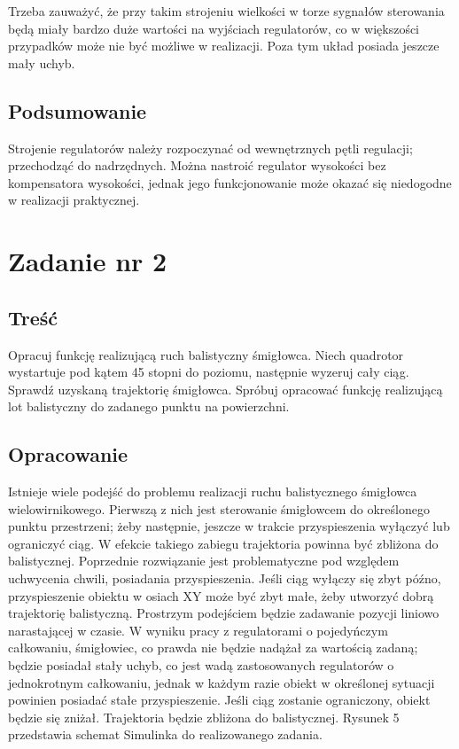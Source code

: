 \documentclass[polish,11pt,a4paper]{article}
\begin{document}
Trzeba zauważyć, że przy takim strojeniu wielkości w torze sygnałów sterowania będą miały bardzo duże wartości
na wyjściach regulatorów, co w większości przypadków może nie być możliwe w realizacji. Poza tym układ posiada jeszcze
mały uchyb. 
\subsection*{Podsumowanie}
Strojenie regulatorów należy rozpoczynać od wewnętrznych pętli regulacji; przechodząć do nadrzędnych. Można nastroić regulator
wysokości bez kompensatora wysokości, jednak jego funkcjonowanie może okazać się niedogodne w realizacji praktycznej.
\section*{Zadanie nr 2}
\subsection*{Treść}
Opracuj funkcję realizującą ruch balistyczny śmigłowca. Niech quadrotor wystartuje
pod kątem 45 stopni do poziomu, następnie wyzeruj cały ciąg. Sprawdź uzyskaną trajektorię śmigłowca.
Spróbuj opracować funkcję realizującą lot balistyczny do zadanego punktu na powierzchni.

\subsection*{Opracowanie}
Istnieje wiele podejść do problemu realizacji ruchu balistycznego śmigłowca wielowirnikowego.
Pierwszą z nich jest sterowanie śmigłowcem do określonego punktu przestrzeni; żeby następnie, jeszcze 
w trakcie przyspieszenia wyłączyć lub ograniczyć ciąg. W efekcie takiego zabiegu trajektoria powinna być
zbliżona do balistycznej. Poprzednie rozwiązanie jest problematyczne pod względem uchwycenia chwili, 
posiadania przyspieszenia. Jeśli ciąg wyłączy się zbyt późno, przyspieszenie obiektu w osiach XY może być
zbyt małe, żeby utworzyć dobrą trajektorię balistyczną. Prostrzym podejściem będzie zadawanie pozycji
liniowo narastającej w czasie. W wyniku pracy z regulatorami o pojedyńczym całkowaniu, śmigłowiec, co prawda
nie będzie nadążał za wartością zadaną; będzie posiadał stały uchyb, co jest wadą zastosowanych regulatorów o 
jednokrotnym całkowaniu, jednak w każdym razie obiekt w określonej sytuacji powinien posiadać stałe przyspieszenie.
Jeśli ciąg zostanie ograniczony, obiekt będzie się zniżał. Trajektoria będzie zbliżona 
do balistycznej. Rysunek 5 przedstawia schemat Simulinka do realizowanego zadania.
\end{document}
